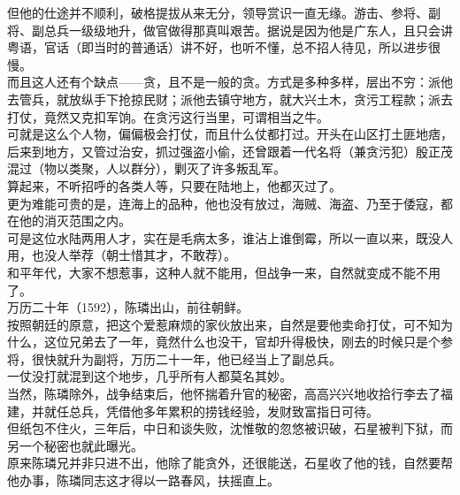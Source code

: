 \begin{multicols}{\theparacolNo}
但他的仕途并不顺利，破格提拔从来无分，领导赏识一直无缘。游击、参将、副将、副总兵一级级地升，做官做得那真叫艰苦。据说是因为他是广东人，且只会讲粤语，官话（即当时的普通话）讲不好，也听不懂，总不招人待见，所以进步很慢。\\

而且这人还有个缺点——贪，且不是一般的贪。方式是多种多样，层出不穷：派他去管兵，就放纵手下抢掠民财；派他去镇守地方，就大兴土木，贪污工程款；派去打仗，竟然又克扣军饷。在贪污这行当里，可谓相当之牛。\\

可就是这么个人物，偏偏极会打仗，而且什么仗都打过。开头在山区打土匪地痞，后来到地方，又管过治安，抓过强盗小偷，还曾跟着一代名将（兼贪污犯）殷正茂混过（物以类聚，人以群分），剿灭了许多叛乱军。\\

算起来，不听招呼的各类人等，只要在陆地上，他都灭过了。\\

更为难能可贵的是，连海上的品种，他也没有放过，海贼、海盗、乃至于倭寇，都在他的消灭范围之内。\\

可是这位水陆两用人才，实在是毛病太多，谁沾上谁倒霉，所以一直以来，既没人用，也没人举荐（朝士惜其才，不敢荐）。\\

和平年代，大家不想惹事，这种人就不能用，但战争一来，自然就变成不能不用了。\\

万历二十年（1592），陈璘出山，前往朝鲜。\\

按照朝廷的原意，把这个爱惹麻烦的家伙放出来，自然是要他卖命打仗，可不知为什么，这位兄弟去了一年，竟然什么也没干，官却升得极快，刚去的时候只是个参将，很快就升为副将，万历二十一年，他已经当上了副总兵。\\

一仗没打就混到这个地步，几乎所有人都莫名其妙。\\

当然，陈璘除外，战争结束后，他怀揣着升官的秘密，高高兴兴地收拾行李去了福建，并就任总兵，凭借他多年累积的捞钱经验，发财致富指日可待。\\

但纸包不住火，三年后，中日和谈失败，沈惟敬的忽悠被识破，石星被判下狱，而另一个秘密也就此曝光。\\

原来陈璘兄并非只进不出，他除了能贪外，还很能送，石星收了他的钱，自然要帮他办事，陈璘同志这才得以一路春风，扶摇直上。\\


\end{multicols}
